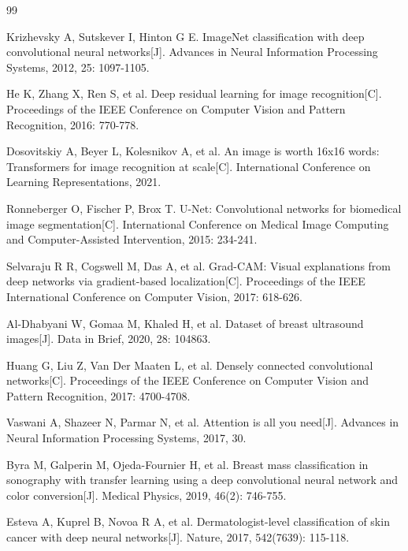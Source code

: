 \documentclass[supercite]{Hust-undergraduate-kaiti}
\theoremstyle{definition}
\begin{document}
\begin{thebibliography}{99}

 Krizhevsky A, Sutskever I, Hinton G E. ImageNet classification with deep convolutional neural networks[J]. Advances in Neural Information Processing Systems, 2012, 25: 1097-1105.

 He K, Zhang X, Ren S, et al. Deep residual learning for image recognition[C]. Proceedings of the IEEE Conference on Computer Vision and Pattern Recognition, 2016: 770-778.

 Dosovitskiy A, Beyer L, Kolesnikov A, et al. An image is worth 16x16 words: Transformers for image recognition at scale[C]. International Conference on Learning Representations, 2021.

 Ronneberger O, Fischer P, Brox T. U-Net: Convolutional networks for biomedical image segmentation[C]. International Conference on Medical Image Computing and Computer-Assisted Intervention, 2015: 234-241.

 Selvaraju R R, Cogswell M, Das A, et al. Grad-CAM: Visual explanations from deep networks via gradient-based localization[C]. Proceedings of the IEEE International Conference on Computer Vision, 2017: 618-626.

 Al-Dhabyani W, Gomaa M, Khaled H, et al. Dataset of breast ultrasound images[J]. Data in Brief, 2020, 28: 104863.

 Huang G, Liu Z, Van Der Maaten L, et al. Densely connected convolutional networks[C]. Proceedings of the IEEE Conference on Computer Vision and Pattern Recognition, 2017: 4700-4708.

 Vaswani A, Shazeer N, Parmar N, et al. Attention is all you need[J]. Advances in Neural Information Processing Systems, 2017, 30.

 Byra M, Galperin M, Ojeda-Fournier H, et al. Breast mass classification in sonography with transfer learning using a deep convolutional neural network and color conversion[J]. Medical Physics, 2019, 46(2): 746-755.

 Esteva A, Kuprel B, Novoa R A, et al. Dermatologist-level classification of skin cancer with deep neural networks[J]. Nature, 2017, 542(7639): 115-118.

\end{thebibliography}
\end{document}

